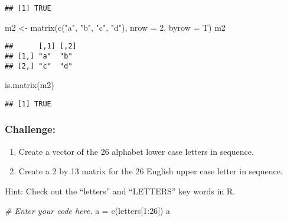 \documentclass[
]{article}
\newenvironment{Shaded}{\begin{snugshade}}{\end{snugshade}}
\newcommand{\AttributeTok}[1]{\textcolor[rgb]{0.77,0.63,0.00}{#1}}
\newcommand{\CommentTok}[1]{\textcolor[rgb]{0.56,0.35,0.01}{\textit{#1}}}
\newcommand{\DecValTok}[1]{\textcolor[rgb]{0.00,0.00,0.81}{#1}}
\newcommand{\FunctionTok}[1]{\textcolor[rgb]{0.00,0.00,0.00}{#1}}
\newcommand{\NormalTok}[1]{#1}
\newcommand{\OtherTok}[1]{\textcolor[rgb]{0.56,0.35,0.01}{#1}}
\newcommand{\SpecialCharTok}[1]{\textcolor[rgb]{0.00,0.00,0.00}{#1}}
\newcommand{\StringTok}[1]{\textcolor[rgb]{0.31,0.60,0.02}{#1}}
\providecommand{\tightlist}{%
  \setlength{\itemsep}{0pt}\setlength{\parskip}{0pt}}
\begin{document}
\begin{verbatim}
## [1] TRUE
\end{verbatim}

\begin{Shaded}
\begin{Highlighting}[]
\NormalTok{m2 }\OtherTok{\textless{}{-}} \FunctionTok{matrix}\NormalTok{(}\FunctionTok{c}\NormalTok{(}\StringTok{"a"}\NormalTok{, }\StringTok{"b"}\NormalTok{, }
               \StringTok{"c"}\NormalTok{, }\StringTok{"d"}\NormalTok{), }
               \AttributeTok{nrow =} \DecValTok{2}\NormalTok{,}
               \AttributeTok{byrow =}\NormalTok{ T)}
\NormalTok{m2}
\end{Highlighting}
\end{Shaded}

\begin{verbatim}
##      [,1] [,2]
## [1,] "a"  "b" 
## [2,] "c"  "d"
\end{verbatim}

\begin{Shaded}
\begin{Highlighting}[]
\FunctionTok{is.matrix}\NormalTok{(m2)}
\end{Highlighting}
\end{Shaded}

\begin{verbatim}
## [1] TRUE
\end{verbatim}

\hypertarget{challenge-1}{%
\subsubsection{Challenge:}\label{challenge-1}}

\begin{enumerate}
\def\labelenumi{\arabic{enumi}.}
\tightlist
\item
  Create a vector of the 26 alphabet lower case letters in sequence.
\item
  Create a 2 by 13 matrix for the 26 English upper case letter in
  sequence.
\end{enumerate}

Hint: Check out the ``letters'' and ``LETTERS'' key words in R.

\begin{Shaded}
\begin{Highlighting}[]
\CommentTok{\# Enter your code here.}
\NormalTok{a }\OtherTok{=} \FunctionTok{c}\NormalTok{(letters[}\DecValTok{1}\SpecialCharTok{:}\DecValTok{26}\NormalTok{])}
\NormalTok{a}
\end{Highlighting}
\end{Shaded}
\end{document}
